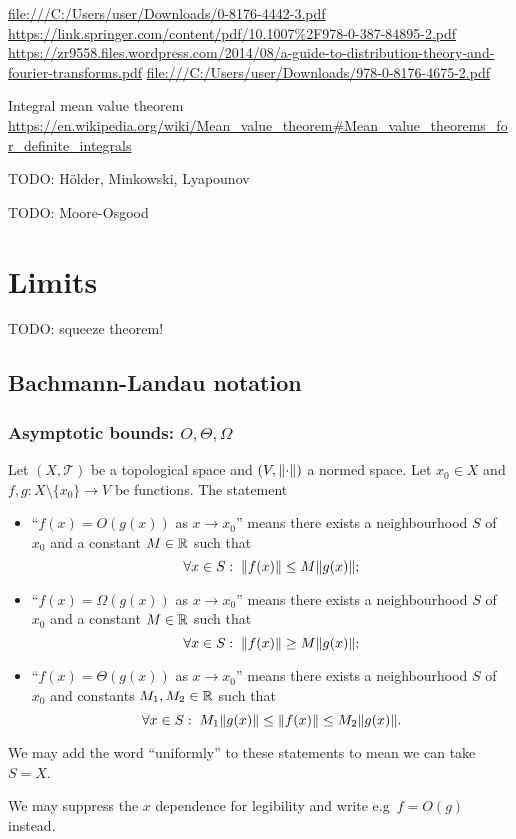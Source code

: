 \url{file:///C:/Users/user/Downloads/0-8176-4442-3.pdf}
\url{https://link.springer.com/content/pdf/10.1007%2F978-0-387-84895-2.pdf}
\url{https://zr9558.files.wordpress.com/2014/08/a-guide-to-distribution-theory-and-fourier-transforms.pdf}
\url{file:///C:/Users/user/Downloads/978-0-8176-4675-2.pdf}

Integral mean value theorem \url{https://en.wikipedia.org/wiki/Mean_value_theorem#Mean_value_theorems_for_definite_integrals}

TODO: Hölder, Minkowski, Lyapounov

TODO: Moore-Osgood

\chapter{Limits}

TODO: squeeze theorem!

\section{Bachmann-Landau notation}
\subsection{Asymptotic bounds: $O, \Theta, \Omega$}
\begin{definition}
Let $(X,\mathcal{T})$ be a topological space and $(V,\lVert\cdot\rVert)$ a normed space. Let $x_0 \in X$ and $f,g: X\setminus\{x_0\}\to V$ be functions. The statement
\begin{itemize}
\item ``$f(x) = O(g(x))$ as $x\to x_0$'' means there exists a neighbourhood $S$ of $x_0$ and a constant $M\in\mathbb{R}$ such that
\[ \forall x\in S:\; \lVert f(x)\rVert \leq M\lVert g(x)\rVert; \]
\item ``$f(x) = \Omega(g(x))$ as $x\to x_0$'' means there exists a neighbourhood $S$ of $x_0$ and a constant $M\in\mathbb{R}$ such that
\[ \forall x\in S:\; \lVert f(x)\rVert \geq M\lVert g(x)\rVert; \]
\item ``$f(x) = \Theta(g(x))$ as $x\to x_0$'' means there exists a neighbourhood $S$ of $x_0$ and constants $M_1,M_2\in\mathbb{R}$ such that
\[ \forall x\in S:\; M_1\lVert g(x)\rVert \leq \lVert f(x)\rVert \leq M_2\lVert g(x)\rVert. \]
\end{itemize}
We may add the word ``uniformly'' to these statements to mean we can take $S=X$.

We may suppress the $x$ dependence for legibility and write e.g\ $f = O(g)$ instead.
\end{definition}

